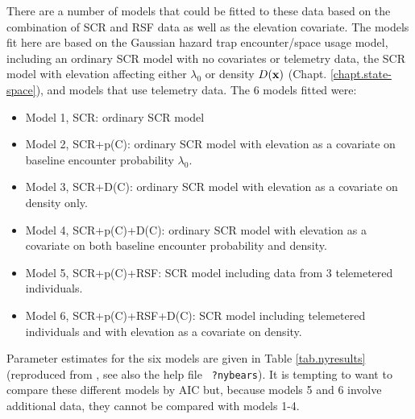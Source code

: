 
There are a number of models that could be fitted to these data based on
the combination of SCR and RSF data as well as the elevation covariate.  
The models fit here are
 based on the Gaussian hazard trap encounter/space usage model,
including an ordinary SCR model with no covariates or telemetry data,
the SCR model with elevation affecting either $\lambda_{0}$ or density
$D({\bf x})$ (Chapt. \ref{chapt.state-space}), and models that use
telemetry data.  The 6 models fitted were:
\begin{itemize}
\item[] Model 1, SCR: ordinary SCR model

\item[] Model 2, SCR+p(C): ordinary SCR model with elevation as a
  covariate on baseline encounter probability $\lambda_{0}$.

\item[] Model 3, SCR+D(C): ordinary SCR model with elevation as a
  covariate on density only.

\item[] Model 4, SCR+p(C)+D(C): ordinary SCR model with elevation as
  a covariate on both baseline encounter probability and density.

\item[] Model 5, SCR+p(C)+RSF: SCR model including data from 3
  telemetered individuals.

\item[] Model 6, SCR+p(C)+RSF+D(C): SCR model including telemetered
  individuals and with elevation as a covariate on density.
\end{itemize}
Parameter estimates for the six models are
given in Table \ref{tab.nyresults} (reproduced from
\citet{royle_etal:2012mee}, see also the help file \mbox{\tt
  ?nybears}).
It is tempting to want to compare these different models by AIC but,
because models 5 and 6 involve additional data, they cannot be
compared with models 1-4.  

